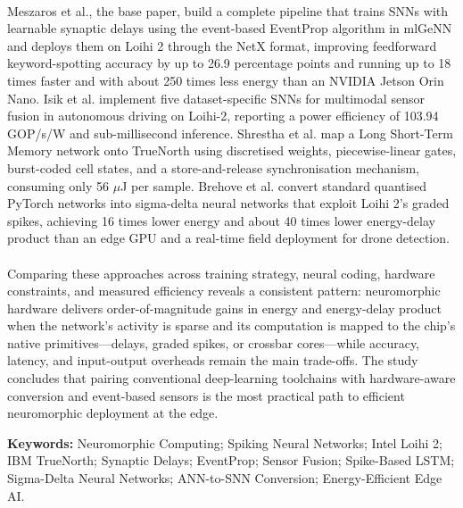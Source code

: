 \documentclass[12pt,a4paper,final]{extreport}
\begin{document}
\paragraph{} Meszaros et al., the base paper, build a complete pipeline that trains SNNs with learnable synaptic delays using the event-based EventProp algorithm in mlGeNN and deploys them on Loihi 2 through the NetX format, improving feedforward keyword-spotting accuracy by up to 26.9 percentage points and running up to 18 times faster and with about 250 times less energy than an NVIDIA Jetson Orin Nano. Isik et al. implement five dataset-specific SNNs for multimodal sensor fusion in autonomous driving on Loihi-2, reporting a power efficiency of 103.94 GOP/s/W and sub-millisecond inference. Shrestha et al. map a Long Short-Term Memory network onto TrueNorth using discretised weights, piecewise-linear gates, burst-coded cell states, and a store-and-release synchronisation mechanism, consuming only 56 $\mu$J per sample. Brehove et al. convert standard quantised PyTorch networks into sigma-delta neural networks that exploit Loihi 2's graded spikes, achieving 16 times lower energy and about 40 times lower energy-delay product than an edge GPU and a real-time field deployment for drone detection.

\paragraph{} Comparing these approaches across training strategy, neural coding, hardware constraints, and measured efficiency reveals a consistent pattern: neuromorphic hardware delivers order-of-magnitude gains in energy and energy-delay product when the network's activity is sparse and its computation is mapped to the chip's native primitives---delays, graded spikes, or crossbar cores---while accuracy, latency, and input-output overheads remain the main trade-offs. The study concludes that pairing conventional deep-learning toolchains with hardware-aware conversion and event-based sensors is the most practical path to efficient neuromorphic deployment at the edge.

\vspace{0.5cm}
\noindent
\textbf{Keywords:} Neuromorphic Computing; Spiking Neural Networks; Intel Loihi 2; IBM TrueNorth; Synaptic Delays; EventProp; Sensor Fusion; Spike-Based LSTM; Sigma-Delta Neural Networks; ANN-to-SNN Conversion; Energy-Efficient Edge AI.
\endgroup

\newpage

\thispagestyle{plain}
\begingroup
{}
\tableofcontents
\endgroup
\begingroup
{}
\listoffigures
{}
\listoftables
{}
\endgroup
\end{document}
